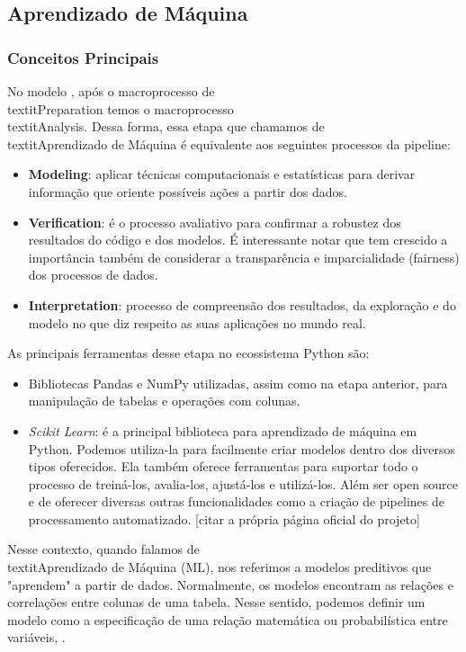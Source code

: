 \subsection{Aprendizado de Máquina}
\subsubsection{Conceitos Principais}
No modelo \cite{BATON}, após o macroprocesso de \\textit{Preparation} temos o macroprocesso \\textit{Analysis}. Dessa forma, essa etapa que chamamos de \\textit{Aprendizado de Máquina} é equivalente aos seguintes processos da pipeline:
\begin{itemize}
\item \textbf{Modeling}: aplicar técnicas computacionais e estatísticas para derivar informação que oriente possíveis ações a partir dos dados. 
\item \textbf{Verification}: é o processo avaliativo para confirmar a robustez dos resultados do código e dos modelos. É interessante notar que tem crescido a importância também de considerar a transparência e imparcialidade (fairness) dos processos de dados. 
\item \textbf{Interpretation}: processo de compreensão dos resultados, da exploração e do modelo no que diz respeito as suas aplicações no mundo real.
\end{itemize}

As principais ferramentas desse etapa no ecossistema Python são:
\begin{itemize}
\item Bibliotecas Pandas e NumPy utilizadas, assim como na etapa anterior, para manipulação de tabelas e operações com colunas.
\item \textit{Scikit Learn}: é a principal biblioteca para aprendizado de máquina em Python. Podemos utiliza-la para facilmente criar modelos dentro dos diversos tipos oferecidos. Ela também oferece ferramentas para suportar todo o processo de treiná-los, avalia-los, ajustá-los e utilizá-los. Além ser open source e de oferecer diversas outras funcionalidades como a criação de pipelines de processamento automatizado. [citar a própria página oficial do projeto] 
\end{itemize}

Nesse contexto, quando falamos de \\textit{Aprendizado de Máquina} (ML), nos referimos a modelos preditivos que "aprendem" a partir de dados. Normalmente, os modelos encontram as relações e correlações entre colunas de uma tabela. Nesse sentido, podemos definir um modelo como a especificação de uma relação matemática ou probabilística entre variáveis,  \cite{SCRATCH} \cite{PRINCIPLES}.

